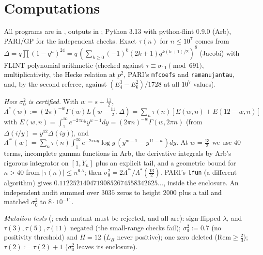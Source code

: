 \section{Computations}\label{sec:computations}

All programs are in , outputs in ; Python 3.13 with python-flint 0.9.0 (Arb), PARI/GP for the independent checks. Exact $\tau(n)$ for $n\le10^7$ comes from $\Delta=q\prod(1-q^n)^{24}=q\,(\sum_{k\ge0}(-1)^k(2k+1)q^{k(k+1)/2})^8$ (Jacobi) with FLINT polynomial arithmetic (checked against $\tau\equiv\sigma_{11}\pmod{691}$, multiplicativity, the Hecke relation at $p^2$, PARI's \texttt{mfcoefs} and \texttt{ramanujantau}, and, by the second referee, against $(E_4^3-E_6^2)/1728$ at all $10^7$ values).

\emph{How $\sigma_0^2$ is certified.} With $w=s+\frac{11}2$, $\Lambda^*(w):=(2\pi)^{-w}\Gamma(w)L(w-\frac{11}2,\Delta)=\sum_n\tau(n)[E(w,n)+E(12-w,n)]$ with $E(w,n)=\int_1^\infty e^{-2\pi ny}y^{w-1}dy=(2\pi n)^{-w}\Gamma(w,2\pi n)$ (from $\Delta(i/y)=y^{12}\Delta(iy)$), and $\Lambda^{*\prime}(w)=\sum_n\tau(n)\int_1^\infty e^{-2\pi ny}\log y\,(y^{w-1}-y^{11-w})dy$. At $w=\frac{13}2$ we use $40$ terms, incomplete gamma functions in Arb, the derivative integrals by Arb's rigorous integrator on $[1,Y_n]$ plus an explicit tail, and a geometric bound for $n>40$ from $|\tau(n)|\le n^{6.5}$; then $\sigma_0^2=2\Lambda^{*\prime}/\Lambda^*(\frac{13}2)$. PARI's \texttt{lfun} (a different algorithm) gives $0.11225214047190852674558342625\ldots$, inside the enclosure. An independent audit summed over $3035$ zeros to height $2000$ plus a tail and matched $\sigma_0^2$ to $8\cdot10^{-11}$.

\emph{Mutation tests} (; each mutant must be rejected, and all are): sign-flipped $\lambda$, and $\tau(3),\tau(5),\tau(11)$ negated (the small-range checks fail); $\sigma_0^2:=0.7$ (no positivity threshold) and $H=12$ ($L_B$ never positive); one zero deleted ($\mathrm{Rem}\ge\frac23$); $\tau(2):=\tau(2)+1$ ($\sigma_0^2$ leaves its enclosure).
